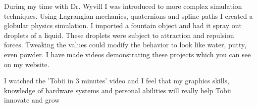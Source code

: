 During my time with Dr. Wyvill I was introduced to more complex simulation techniques.
Using Lagrangian mechanics, quaternions and spline paths I created a globular physics simulation. 
I imported a fountain object and had it spray out droplets of a liquid.
These droplets were subject to attraction and repulsion forces.
Tweaking the values could modify the behavior to look like water, putty, even powder.
I have made videos demonstrating these projects which you can see on my website.

I watched the 'Tobii in 3 minutes' video and I feel that my graphics skills, knowledge of hardware systems and personal abilities will really help Tobii innovate and grow
